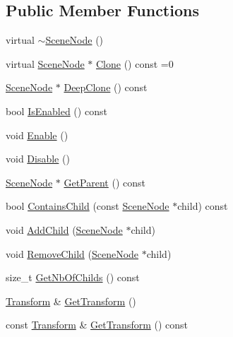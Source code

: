 \subsection*{Public Member Functions}
\begin{DoxyCompactItemize}
\item 
virtual \hyperlink{classmage_1_1_scene_node_a6705beea9c535de3d495762ed06e74dd}{$\sim$\+Scene\+Node} ()
\item 
virtual \hyperlink{classmage_1_1_scene_node}{Scene\+Node} $\ast$ \hyperlink{classmage_1_1_scene_node_a85d62213a900cd8e45864b8cde5929e9}{Clone} () const =0
\item 
\hyperlink{classmage_1_1_scene_node}{Scene\+Node} $\ast$ \hyperlink{classmage_1_1_scene_node_a5dcfacd607e3f8554f7eac73a51be334}{Deep\+Clone} () const
\item 
bool \hyperlink{classmage_1_1_scene_node_a5e3b2a5d21cb2e17df4ae50344bd6bbc}{Is\+Enabled} () const
\item 
void \hyperlink{classmage_1_1_scene_node_a7fb08a122d822394a96a9c2bcf6aab7f}{Enable} ()
\item 
void \hyperlink{classmage_1_1_scene_node_ab2113dd62439d81a31bdfdf44d02061e}{Disable} ()
\item 
\hyperlink{classmage_1_1_scene_node}{Scene\+Node} $\ast$ \hyperlink{classmage_1_1_scene_node_a512a9d0f935abf304980312680be3f30}{Get\+Parent} () const
\item 
bool \hyperlink{classmage_1_1_scene_node_a99c86a1d18b41d4c5ce0384ba53a0952}{Contains\+Child} (const \hyperlink{classmage_1_1_scene_node}{Scene\+Node} $\ast$child) const
\item 
void \hyperlink{classmage_1_1_scene_node_ac07f89af783b1658a1f74205914f6fa3}{Add\+Child} (\hyperlink{classmage_1_1_scene_node}{Scene\+Node} $\ast$child)
\item 
void \hyperlink{classmage_1_1_scene_node_a42aa6487f21c948ab7ce6f64a57e5f11}{Remove\+Child} (\hyperlink{classmage_1_1_scene_node}{Scene\+Node} $\ast$child)
\item 
size\+\_\+t \hyperlink{classmage_1_1_scene_node_a99c5eb3c253a2e620bd85ac845d3bb77}{Get\+Nb\+Of\+Childs} () const
\item 
\hyperlink{structmage_1_1_transform}{Transform} \& \hyperlink{classmage_1_1_scene_node_a72bfe51e9f233dd35fd8affd24b0a67a}{Get\+Transform} ()
\item 
const \hyperlink{structmage_1_1_transform}{Transform} \& \hyperlink{classmage_1_1_scene_node_ab68ffa4886e8e5ff9757362823a1aa74}{Get\+Transform} () const
\item 

\end{DoxyCompactItemize}

